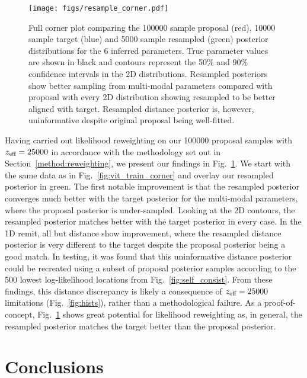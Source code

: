 \documentclass[a4paper]{jpconf}
\begin{document}
\begin{figure}
	\centering
	\texttt{[image: figs/resample\_corner.pdf]}
	\caption{Full corner plot comparing the 100000 sample proposal (red), 10000 sample target (blue) and 5000 sample resampled (green) posterior distributions for the 6 inferred parameters. True parameter values are shown in black and contours represent the 50\% and 90\% confidence intervals in the 2D distributions. Resampled posteriors show better sampling from multi-modal parameters compared with proposal with every 2D distribution showing resampled to be better aligned with target. Resampled distance posterior is, however, uninformative despite original proposal being well-fitted. }
	\label{fig:final_corner}
\end{figure}

Having carried out likelihood reweighting on our 100000 proposal samples with $z_\textup{eff}=25000$ in accordance with the methodology set out in Section~\ref{method:reweighting}, we present our findings in Fig.~\ref{fig:final_corner}. We start with the same data as in Fig.~\ref{fig:vit_train_corner} and overlay our resampled posterior in green. The first notable improvement is that the resampled posterior converges much better with the target posterior for the multi-modal parameters, where the proposal posterior is under-sampled. Looking at the 2D contours, the resampled posterior matches better with the target posterior in every case. In the 1D remit, all but distance show improvement, where the resampled distance posterior is very different to the target despite the proposal posterior being a good match. In testing, it was found that this uninformative distance posterior could be recreated using a subset of proposal posterior samples according to the 500 lowest log-likelihood locations from Fig.~\ref{fig:self_consist}. From these findings, this distance discrepancy is likely a consequence of $z_\textup{eff}=25000$ limitations (Fig.~\ref{fig:hists}), rather than a methodological failure. As a proof-of-concept, Fig.~\ref{fig:final_corner} shows great potential for likelihood reweighting as, in general, the resampled posterior matches the target better than the proposal posterior.


\section{Conclusions}\label{conc} %
\end{document}
